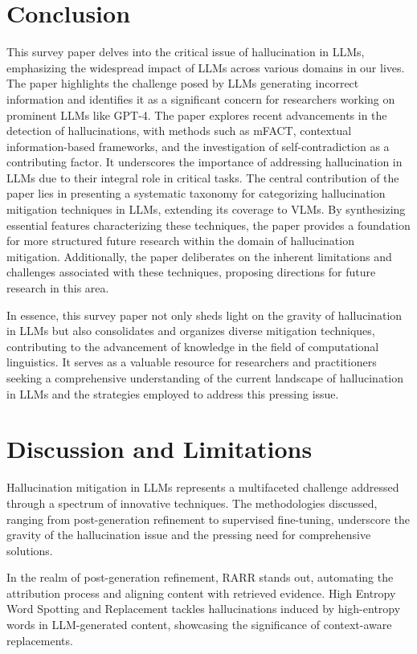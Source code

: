 \documentclass[11pt]{article}
\begin{document}
\section{Conclusion}
This survey paper delves into the critical issue of hallucination in LLMs, emphasizing the widespread impact of LLMs across various domains in our lives. The paper highlights the challenge posed by LLMs generating incorrect information and identifies it as a significant concern for researchers working on prominent LLMs like GPT-4.
The paper explores recent advancements in the detection of hallucinations, with methods such as mFACT, contextual information-based frameworks, and the investigation of self-contradiction as a contributing factor. It underscores the importance of addressing hallucination in LLMs due to their integral role in critical tasks.
The central contribution of the paper lies in presenting a systematic taxonomy for categorizing hallucination mitigation techniques in LLMs, extending its coverage to VLMs. By synthesizing essential features characterizing these techniques, the paper provides a foundation for more structured future research within the domain of hallucination mitigation. Additionally, the paper deliberates on the inherent limitations and challenges associated with these techniques, proposing directions for future research in this area.

In essence, this survey paper not only sheds light on the gravity of hallucination in LLMs but also consolidates and organizes diverse mitigation techniques, contributing to the advancement of knowledge in the field of computational linguistics. It serves as a valuable resource for researchers and practitioners seeking a comprehensive understanding of the current landscape of hallucination in LLMs and the strategies employed to address this pressing issue.

\section{Discussion and Limitations}
Hallucination mitigation in LLMs represents a multifaceted challenge addressed through a spectrum of innovative techniques. The methodologies discussed, ranging from post-generation refinement to supervised fine-tuning, underscore the gravity of the hallucination issue and the pressing need for comprehensive solutions.

In the realm of post-generation refinement, RARR stands out, automating the attribution process and aligning content with retrieved evidence. High Entropy Word Spotting and Replacement tackles hallucinations induced by high-entropy words in LLM-generated content, showcasing the significance of context-aware replacements.
\end{document}
